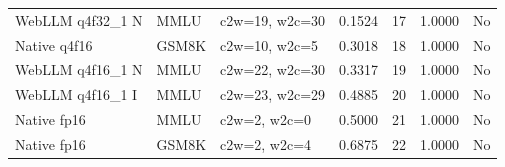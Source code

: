 \documentclass[conference]{IEEEtran}
\begin{document}
\begin{table}[!t]
\begin{tabular}{@{}lllrrrl@{}}
WebLLM q4f32\_1 N & MMLU & c2w=19, w2c=30 & 0.1524 & 17 & 1.0000 & No\\
Native q4f16 & GSM8K & c2w=10, w2c=5 & 0.3018 & 18 & 1.0000 & No\\
WebLLM q4f16\_1 N & MMLU & c2w=22, w2c=30 & 0.3317 & 19 & 1.0000 & No\\
WebLLM q4f16\_1 I & MMLU & c2w=23, w2c=29 & 0.4885 & 20 & 1.0000 & No\\
Native fp16 & MMLU & c2w=2, w2c=0 & 0.5000 & 21 & 1.0000 & No\\
Native fp16 & GSM8K & c2w=2, w2c=4 & 0.6875 & 22 & 1.0000 & No\\
\bottomrule
\end{tabular}
\end{table}

\clearpage
\end{document}
